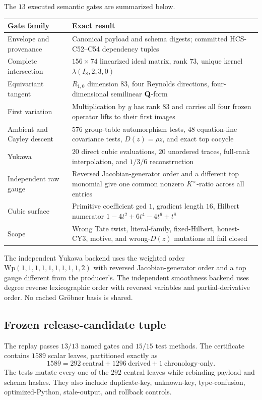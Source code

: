 The \(13\) executed semantic gates are summarized below.
\begin{center}
\small
\begin{tabular}{@{}p{}p{}@{}}
\toprule
Gate family & Exact result\\
\midrule
Envelope and provenance
& Canonical payload and schema digests; committed HCS-C52--C54 dependency
tuples\\
Complete intersection
& \(156\times74\) linearized ideal matrix, rank \(73\), unique kernel
\(\lambda(I_8,2,3,0)\)\\
Equivariant tangent
& \(R_{1,0}\) dimension \(83\), four Reynolds directions, four-dimensional
semilinear \(\mathbf Q\)-form\\
First variation
& Multiplication by \(y\) has rank \(83\) and carries all four frozen
operator lifts to their first images\\
Ambient and Cayley descent
& \(576\) group-table automorphism tests, \(48\) equation-line covariance
tests, \(D(z)=\rho z\), and exact top cocycle\\
Yukawa
& \(20\) direct cubic evaluations, \(20\) unordered traces, full-rank
interpolation, and \(1/3/6\) reconstruction\\
Independent raw gauge
& Reversed Jacobian-generator order and a different top monomial give one
common nonzero \(K^\times\)-ratio across all entries\\
Cubic surface
& Primitive coefficient gcd \(1\), gradient length \(16\), Hilbert
numerator \(1-4t^2+6t^4-4t^6+t^8\)\\
Scope
& Wrong Tate twist, literal-family, fixed-Hilbert, honest-CY3, motive, and
wrong-\(D(z)\) mutations all fail closed\\
\bottomrule
\end{tabular}
\end{center}

The independent Yukawa backend uses the weighted order
\(\mathrm{Wp}(1,1,1,1,1,1,1,1,1,2)\) with reversed Jacobian-generator
order and a top gauge different from the producer's.  The independent
smoothness backend uses degree reverse lexicographic order with reversed
variables and partial-derivative order.  No cached Gr\"obner basis is shared.

\subsection{Frozen release-candidate tuple}

The replay passes \(13/13\) named gates and \(15/15\) test methods.  The
certificate contains \(1589\) scalar leaves, partitioned exactly as
\[
 1589=292\ \text{central}+1296\ \text{derived}
      +1\ \text{chronology-only}.                  \tag{10.1}
\]
The tests mutate every one of the \(292\) central leaves while rebinding
payload and schema hashes.  They also include duplicate-key, unknown-key,
type-confusion, optimized-Python, stale-output, and rollback controls.

